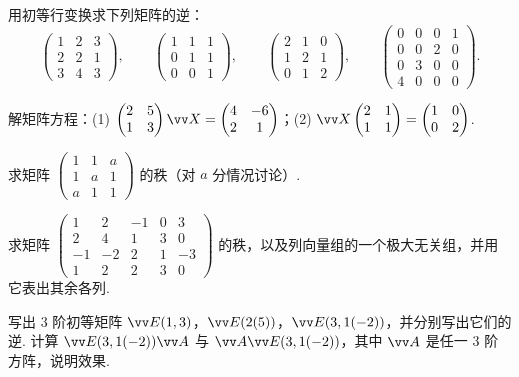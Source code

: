{\begin{exA}
			\item\label{ex:mat:A5} 用初等行变换求下列矩阵的逆：
			\[\begin{pmatrix}1&2&3\\2&2&1\\3&4&3\end{pmatrix},\qquad\begin{pmatrix}1&1&1\\0&1&1\\0&0&1\end{pmatrix},\qquad \begin{pmatrix}2&1&0\\1&2&1\\0&1&2\end{pmatrix},\qquad\begin{pmatrix}0&0&0&1\\0&0&2&0\\0&3&0&0\\4&0&0&0\end{pmatrix}.\]
			\item\label{ex:mat:A6} 解矩阵方程：(1) $\begin{pmatrix}2&5\\1&3\end{pmatrix}\vv X=\begin{pmatrix}4&-6\\2&1\end{pmatrix}$；(2) $\vv X\begin{pmatrix}2&1\\1&1\end{pmatrix}=\begin{pmatrix}1&0\\0&2\end{pmatrix}$.
			\item\label{ex:mat:A7} 求矩阵 $\begin{pmatrix}1&1&a\\1&a&1\\a&1&1\end{pmatrix}$ 的秩（对 $a$ 分情况讨论）.
			\item\label{ex:mat:A8} 求矩阵 $\begin{pmatrix}1&2&-1&0&3\\2&4&1&3&0\\-1&-2&2&1&-3\\1&2&2&3&0\end{pmatrix}$ 的秩，以及列向量组的一个极大无关组，并用它表出其余各列.
			\item\label{ex:mat:A9} 写出 $3$ 阶初等矩阵 $\vv E(1,3)$，$\vv E(2(5))$，$\vv E(3,1(-2))$，并分别写出它们的逆. 计算 $\vv E(3,1(-2))\vv A$ 与 $\vv A\vv E(3,1(-2))$，其中 $\vv A$ 是任一 $3$ 阶方阵，说明效果.

\end{exA}}
